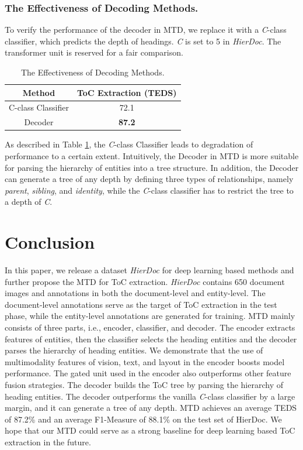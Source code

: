 \documentclass[a4paper,conference]{IEEEtran}
\begin{document}
\subsubsection{The Effectiveness of Decoding Methods.}
To verify the performance of the decoder in MTD, we replace it with a \textit{C}-class classifier, which predicts the depth of headings. \textit{C} is set to 5 in \textit{HierDoc}. The transformer unit is reserved for a fair comparison.

\begin{table}[h]
\caption{The Effectiveness of Decoding Methods.}
\label{tabel:decoder}
\centering
\begin{tabular}{c|c}
\hline
Method & ToC Extraction (TEDS) \\ \hline
C-class Classifier & 72.1 \\ \hline
Decoder & \textbf{87.2} \\ \hline
\end{tabular}
\end{table}


As described in Table \ref{tabel:decoder}, the \textit{C}-class Classifier leads to degradation of performance to a certain extent. Intuitively, the Decoder in MTD is more suitable for parsing the hierarchy of entities into a tree structure. In addition, the Decoder can generate a tree of any depth by defining three types of relationships, namely \textit{parent}, \textit{sibling}, and \textit{identity}, while the \textit{C}-class classifier has to restrict the tree to a depth of \textit{C}.


\section{Conclusion}
In this paper, we release a dataset \textit{HierDoc} for deep learning based methods and further propose the MTD for ToC extraction. \textit{HierDoc} contains 650 document images and annotations in both the document-level and entity-level. The document-level annotations serve as the target of ToC extraction in the test phase, while the entity-level annotations are generated for training. MTD mainly consists of three parts, i.e., encoder, classifier, and decoder. The encoder extracts features of entities, then the classifier selects the heading entities and the decoder parses the hierarchy of heading entities. We demonstrate that the use of multimodality features of vision, text, and layout in the encoder boosts model performance. The gated unit used in the encoder also outperforms other feature fusion strategies. The decoder builds the ToC tree by parsing the hierarchy of heading entities. The decoder outperforms the vanilla \textit{C}-class classifier by a large margin, and it can generate a tree of any depth. MTD achieves an average TEDS of 87.2\%  and an average F1-Measure of 88.1\% on the test set of HierDoc. We hope that our MTD could serve as a strong baseline for deep learning based ToC extraction in the future.
\end{document}
